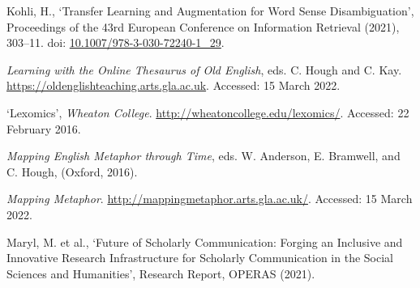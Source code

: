 \begin{list}{}
\item %
Kohli, H., `Transfer Learning and Augmentation for Word Sense Disambiguation', Proceedings of the 43rd European Conference on Information Retrieval (2021), 303–11. doi: \href{https://dx.doi.org/10.1007/978-3-030-72240-1_29}{\url{10.1007/978-3-030-72240-1_29}}.


\item %
\textit{Learning with the Online Thesaurus of Old English}, eds. C. Hough and C. Kay. \url{https://oldenglishteaching.arts.gla.ac.uk}. Accessed: 15 March 2022.



\item %
`Lexomics', \textit{Wheaton College}. \url{http://wheatoncollege.edu/lexomics/}. Accessed: 22 February 2016.


\item %
\textit{Mapping English Metaphor through Time}, eds. W. Anderson, E. Bramwell, and C. Hough, (Oxford, 2016).

\item %
\textit{Mapping Metaphor}. \url{http://mappingmetaphor.arts.gla.ac.uk/}. Accessed: 15 March 2022.

\item %
Maryl, M. et al., `Future of Scholarly Communication: Forging an Inclusive and Innovative Research Infrastructure for Scholarly Communication in the Social Sciences and Humanities', Research Report, OPERAS (2021).


\end{list}
